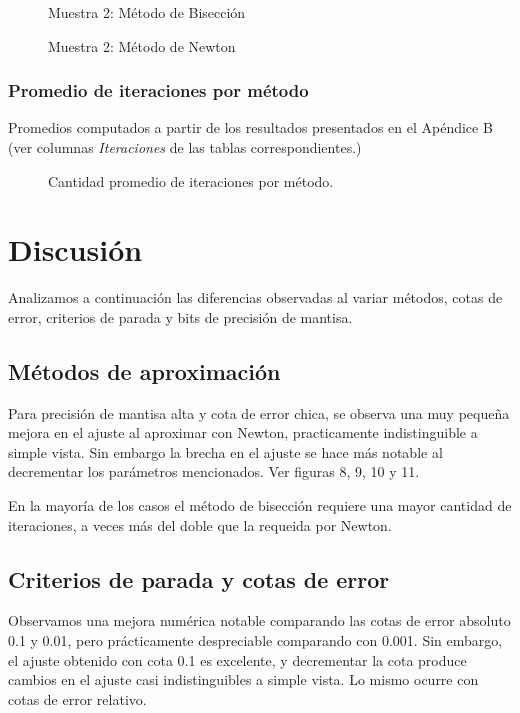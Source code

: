 \documentclass[a4paper,10pt,twoside]{article}
\newcommand{\grafico}[2]{
	\begin{figure}[H]
		\caption{#2}
		\centering
		
	\end{figure}
}
\begin{document}
\grafico{biseccion-criterios-parada.tex}{Muestra 2: Método de Bisección}
\grafico{newton-criterios-parada.tex}{Muestra 2: Método de Newton}

\subsubsection{Promedio de iteraciones por método}

Promedios computados a partir de los resultados presentados en el Apéndice B (ver columnas \textit{Iteraciones} de las tablas correspondientes.)

\begin{figure}[H]
  \centering
  \caption{Cantidad promedio de iteraciones por método.}
  
\end{figure}




\section{Discusión}

Analizamos a continuación las diferencias observadas al variar métodos, cotas
de error, criterios de parada y bits de precisión de mantisa.


\subsection{Métodos de aproximación}
Para precisión de mantisa alta y cota de error chica, se observa una muy pequeña
mejora en el ajuste al aproximar con Newton, practicamente indistinguible a simple
vista. Sin embargo la brecha en el ajuste se hace más notable al decrementar
los parámetros mencionados. Ver figuras 8, 9, 10 y 11.

En la mayoría de los casos el método de bisección requiere una mayor cantidad
de iteraciones, a veces más del doble que la requeida por Newton.


\subsection{Criterios de parada y cotas de error}
Observamos una mejora numérica notable comparando las cotas de error absoluto 0.1 y 0.01,
pero prácticamente despreciable comparando con 0.001. Sin embargo, el ajuste
obtenido con cota 0.1 es excelente, y decrementar la cota produce cambios en
el ajuste casi indistinguibles a simple vista. Lo mismo ocurre con cotas de error relativo.
\end{document}
